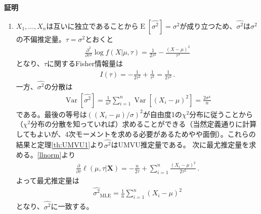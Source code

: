 \documentclass[11pt]{ltjsarticle}
\makeatletter
\theoremstyle{definition}
\DeclareMathOperator{\E}{E}
\DeclareMathOperator{\Var}{Var}
\renewenvironment{proof}[1][証明]{\par
  \pushQED{\qed}%
  \normalfont \topsep6\p@\@plus6\p@\relax
  \trivlist
  \item\relax
  {\bfseries
  #1\@addpunct{.}}\hspace\labelsep\ignorespaces
}{%
  \popQED\endtrivlist\@endpefalse
}
\makeatother
\begin{document}
\begin{proof}
\begin{enumerate}[(1)]
        \item $X_1,\ldots,X_n$は互いに独立であることから$\E[\widehat{\sigma^2}]=\sigma^2$が成り立つため、$\widehat{\sigma^2}$は$\sigma^2$の不偏推定量。$\tau=\sigma^2$とおくと
        \begin{align}
            \frac{\partial^2}{\partial \tau^2}\log f(X|\mu, \tau)=\frac{1}{2\tau^2}-\frac{(X-\mu)^2}{\tau^3}
        \end{align}
        となり、$\tau$に関するFisher情報量は
        \begin{align}
            I(\tau) = -\frac{1}{2\tau^2} + \frac{1}{\tau^2} = \frac{1}{2\tau^2}\,.
        \end{align}
        一方、$\widehat{\sigma^2}$の分散は
        \begin{align}
            \Var[\widehat{\sigma^2}] = \frac{1}{n^2}\sum_{i=1}^n \Var[(X_i-\mu)^2]=\frac{2\sigma^4}{n}
        \end{align}
        である。最後の等号は$\left((X_i-\mu)/\sigma\right)^2$が自由度1の$\chi^2$分布に従うことから（$\chi^2$分布の分散を知っていれば）求めることができる（当然定義通りに計算してもよいが、4次モーメントを求める必要があるためやや面倒）。これらの結果と定理\ref{th:UMVU1}より$\widehat{\sigma^2}$はUMVU推定量である。
        次に最尤推定量を求める。\eqref{llnorm}より
        \begin{align}
            \frac{\partial}{\partial \tau}\ell(\mu, \tau|\bm{X}) = -\frac{n}{2\tau}+\sum_{i=1}^n\frac{(X_i-\mu)^2}{2\tau^2}\,.
        \end{align}
        よって最尤推定量は
        \begin{align}\label{sigmaMLEnorm}
            \widehat{\sigma^2}_{\text{MLE}} = \frac{1}{n}\sum_{i=1}^n(X_i-\mu)^2
        \end{align}
        となり、$\widehat{\sigma^2}$に一致する。


\end{enumerate}
\end{proof}
\end{document}
